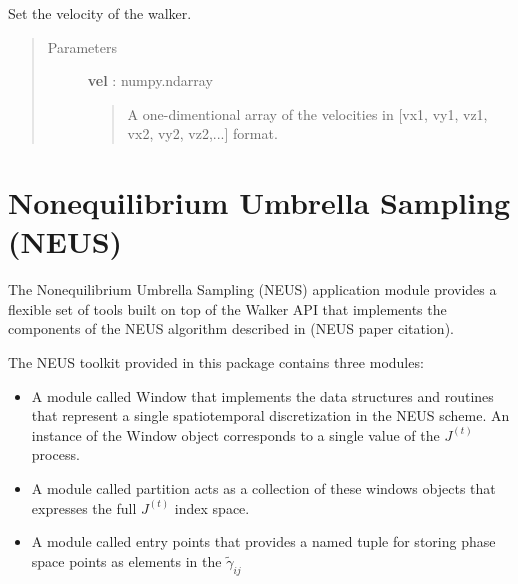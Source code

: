\documentclass[letterpaper,10pt,english]{sphinxmanual}
\begin{document}
\begin{fulllineitems}
\begin{fulllineitems}
\label{walker_api/walker_api.doc:walker_api.lammps_walker.Lammps.set_velocity}
Set the velocity of the walker.
\begin{quote}\begin{description}
\item[{Parameters}] \leavevmode
\textbf{vel} : numpy.ndarray
\begin{quote}

A one-dimentional array of the velocities in {[}vx1, vy1, vz1, vx2, vy2, vz2,...{]} format.
\end{quote}

\end{description}\end{quote}

\end{fulllineitems}


\end{fulllineitems}



\chapter{Nonequilibrium Umbrella Sampling (NEUS)}
\label{neus/neus.doc:nonequilibrium-umbrella-sampling-neus}\label{neus/neus.doc::doc}\label{neus/neus.doc:module-neus}
The Nonequilibrium Umbrella Sampling (NEUS) application module provides a flexible set of tools built on top of the Walker API that implements the components of the NEUS algorithm described in (NEUS paper citation).

The NEUS toolkit provided in this package contains three modules:
\begin{itemize}
\item {} 
A module called Window that implements the data structures and routines that represent a single spatiotemporal discretization in the NEUS scheme. An instance of the Window object corresponds to a single value of the \(J^{(t)}\) process.

\item {} 
A module called partition acts as a collection of these windows objects that expresses the full \(J^{(t)}\) index space.

\item {} 
A module called entry points that provides a named tuple for storing phase space points as elements in the \(\tilde \gamma_{ij}\)

\end{itemize}
\end{document}
